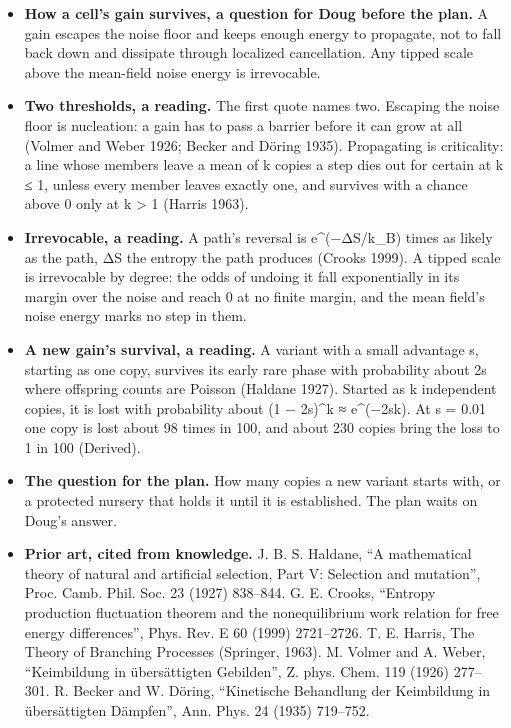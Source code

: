 \begin{enumerate}
\begin{itemize}
\begin{enumerate}
\begin{itemize}
\item \textbf{How a cell's gain survives, a question for Doug before the plan.} A gain escapes the noise floor and keeps enough energy to propagate, not to fall back down and dissipate through localized cancellation. Any tipped scale above the mean-field noise energy is irrevocable.
\item \textbf{Two thresholds, a reading.} The first quote names two. Escaping the noise floor is nucleation: a gain has to pass a barrier before it can grow at all (Volmer and Weber 1926; Becker and Döring 1935). Propagating is criticality: a line whose members leave a mean of k copies a step dies out for certain at k ≤ 1, unless every member leaves exactly one, and survives with a chance above 0 only at k > 1 (Harris 1963).
\item \textbf{Irrevocable, a reading.} A path's reversal is e\textasciicircum{}(−ΔS/k\_\allowbreak{}B) times as likely as the path, ΔS the entropy the path produces (Crooks 1999). A tipped scale is irrevocable by degree: the odds of undoing it fall exponentially in its margin over the noise and reach 0 at no finite margin, and the mean field's noise energy marks no step in them.
\item \textbf{A new gain's survival, a reading.} A variant with a small advantage s, starting as one copy, survives its early rare phase with probability about 2s where offspring counts are Poisson (Haldane 1927). Started as k independent copies, it is lost with probability about (1 − 2s)\textasciicircum{}k ≈ e\textasciicircum{}(−2sk). At s = 0.01 one copy is lost about 98 times in 100, and about 230 copies bring the loss to 1 in 100 (Derived).
\item \textbf{The question for the plan.} How many copies a new variant starts with, or a protected nursery that holds it until it is established. The plan waits on Doug's answer.
\item \textbf{Prior art, cited from knowledge.} J. B. S. Haldane, “A mathematical theory of natural and artificial selection, Part V: Selection and mutation”, Proc. Camb. Phil. Soc. 23 (1927) 838–844. G. E. Crooks, “Entropy production fluctuation theorem and the nonequilibrium work relation for free energy differences”, Phys. Rev. E 60 (1999) 2721–2726. T. E. Harris, The Theory of Branching Processes (Springer, 1963). M. Volmer and A. Weber, “Keimbildung in übersättigten Gebilden”, Z. phys. Chem. 119 (1926) 277–301. R. Becker and W. Döring, “Kinetische Behandlung der Keimbildung in übersättigten Dämpfen”, Ann. Phys. 24 (1935) 719–752.
\end{itemize}
\end{enumerate}


\end{itemize}
\end{enumerate}

